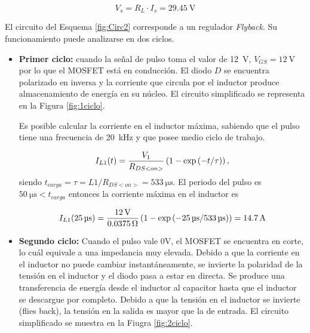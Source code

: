 \begin{equation}
	\boxed{V_s = R_L \cdot I_s = \SI{29,45}{\volt}}
\end{equation}





El circuito del Esquema \ref{fig:Circ2} corresponde a un regulador \textit{Flyback}. Su funcionamiento puede analizarse en dos ciclos. 

\begin{itemize}
	\item \textbf{Primer ciclo:} cuando la señal de pulso toma el valor de \SI{12}{\volt}, $V_{GS}=\SI{12}{\volt}$ por lo que el MOSFET está en conducción. El diodo $D$ se encuentra polarizado en inversa y la corriente que circula por el inductor produce almacenamiento de energía en su núcleo. El circuito simplificado se representa en la Figura \ref{fig:1ciclo}.

		Es posible calcular la corriente en el inductor máxima, sabiendo que el pulso tiene una frecuencia de \SI{20}{\kilo\hertz} y que posee medio ciclo de trabajo.

		\begin{equation}
			\centering
			I_{L1}(t) = \frac{V_1}{R_{DS<on>}} \left(1-\exp{(-t/\tau)}\right),
		\end{equation}
		siendo $t_{carga} = \tau=L1/R_{DS<on>} = \SI{533}{\micro\second}$. El periodo del pulso es $\SI{50}{\micro\second} < t_{carga}$
entonces la corriente máxima en el inductor es

		\begin{equation}
			\centering
					I_{L1}(\SI{25}{\micro\second}) = \frac{\SI{12}{\volt}}{\SI{0.0375}{\ohm} } \left(1-\exp{(\SI{-25}{\micro\second}/ \SI{533}{\micro\second})}\right) = \SI{14.7}{\ampere}
		\end{equation}

	


\item \textbf{Segundo ciclo:}
	Cuando el pulso vale 0V, el MOSFET se encuentra en corte, lo cuál equivale a una impedancia muy elevada. Debido a que la corriente en el inductor no puede cambiar instantáneamente, se invierte la polaridad de la tensión en el inductor y el diodo pasa a estar en directa. Se produce una transferencia de energía desde el inductor al capacitor hasta que el inductor se descargue por completo. Debido a que la tensión en el inductor se invierte (flies back), la tensión en la salida es mayor que la de entrada. El circuito simplificado se muestra en la Fiugra \ref{fig:2ciclo}.


\end{itemize}
